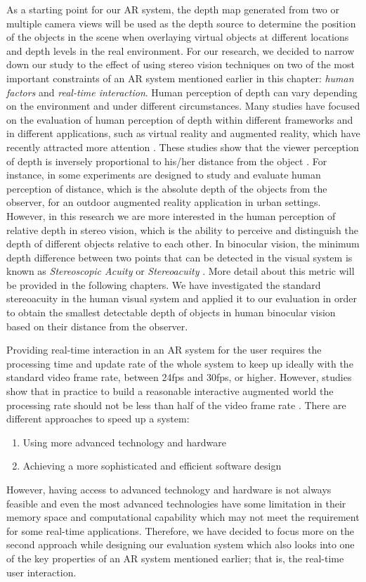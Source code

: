 As a starting point for our AR system, the depth map generated from two or multiple camera views
will be used as the depth source to determine the position of the objects in the scene when
overlaying virtual objects at different locations and depth levels in the real environment. 
For our research, we decided to narrow down our study to the effect of using stereo vision techniques
on two of the most important constraints of an AR system mentioned earlier in this chapter: 
{\it human factors} and {\it real-time interaction}. {\newline}
Human perception of depth can vary depending on the environment and under different circumstances. Many studies have focused on the evaluation of human perception of depth within different frameworks
and in different applications, such as virtual reality and augmented reality, which have recently 
attracted more attention \cite{wann95,dras96,liv05,jer05,swa07,kru10}.
These studies show that the viewer perception of depth
is inversely proportional to his/her distance from the object \cite{kru10,swa07,jer05,liv05}. For instance, in \cite{swa07} some experiments are designed to study and evaluate human
perception of distance, which is the absolute depth of the objects from the observer, for an outdoor augmented reality application in urban settings. 
However, in this research we are more interested in the human perception of relative depth in stereo vision, which is the ability to perceive and distinguish 
the depth of different objects relative to each other. 
In binocular vision, the minimum depth difference between two points 
that can be detected in the visual system is known as {\it Stereoscopic Acuity} or {\it Stereoacuity} \cite{pfa2000}. More detail about
this metric will be provided in the following chapters.
We have investigated the standard stereoacuity in the human visual system and applied it to our evaluation in order to obtain the smallest detectable depth of 
objects in human binocular vision based on their distance from the observer.

Providing real-time interaction in an AR system for the user requires the processing time and update rate of the whole system to keep up ideally with the standard video frame rate, 
between 24fps and 
30fps, or higher. 
However, studies show that in practice to build a reasonable interactive augmented world the processing rate should not be less than half of the video frame rate \cite{hertz00}. 
There are different approaches to speed up a system: 
\begin{enumerate}
\item Using more advanced technology and hardware
\item Achieving a more sophisticated and efficient software design
\end{enumerate}
However, having access to advanced technology and hardware is not always feasible and even the most advanced 
technologies have some limitation in their memory space and computational capability
which may not meet the requirement for some real-time applications. 
Therefore, we have decided to focus more on the second approach while designing our evaluation system which also looks into one of the
key properties of an AR system mentioned earlier; that is, the real-time user interaction.

